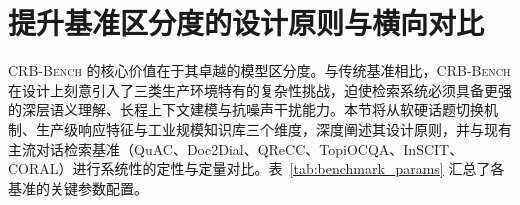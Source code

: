 











\section{提升基准区分度的设计原则与横向对比}
\label{sec:design_principles}

\textsc{CRB-Bench} 的核心价值在于其卓越的模型区分度。与传统基准相比，\textsc{CRB-Bench} 在设计上刻意引入了三类生产环境特有的复杂性挑战，迫使检索系统必须具备更强的深层语义理解、长程上下文建模与抗噪声干扰能力。本节将从软硬话题切换机制、生产级响应特征与工业规模知识库三个维度，深度阐述其设计原则，并与现有主流对话检索基准（QuAC、Doc2Dial、QReCC、TopiOCQA、InSCIT、CORAL）进行系统性的定性与定量对比。表~\ref{tab:benchmark_params} 汇总了各基准的关键参数配置。

